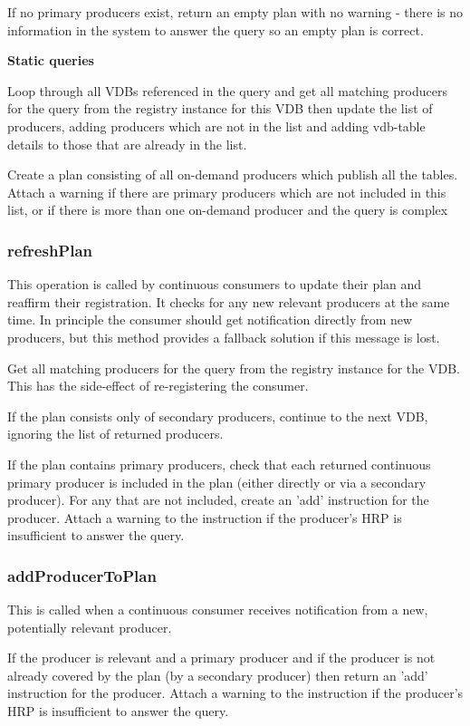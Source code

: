   If no primary producers exist, return an empty plan with no warning - there is no
        information in the system to answer the query so an empty plan is correct.

\textbf{Static queries}

Loop through all VDBs referenced in the query and get all matching producers for
the query from the registry instance for this VDB then update the list of producers, adding producers which are not in the list and
adding vdb-table details to those that are already in the list.
  
Create a plan consisting of all on-demand producers which publish all the tables. 
Attach a warning if there are primary producers which are not included
in this list, or if there is more than one on-demand producer and the query is complex


\subsubsection{refreshPlan}

This operation is called by continuous consumers to update their plan and
reaffirm their registration. It checks for any new relevant producers at the same
time. In principle the consumer should get notification directly from new
producers, but this method provides a fallback solution if this message is lost.

Get all matching producers for the query from the registry instance for the VDB.
This has the side-effect of re-registering the consumer.

If the plan consists only of secondary producers, continue to the next VDB,
ignoring the list of returned producers.

If the plan contains primary producers, check that each returned continuous
primary producer is included in the plan (either directly or via a secondary
producer). For any that are not included, create an 'add' instruction for the
producer. Attach a warning to the instruction if the producer's HRP is
insufficient to answer the query.

\subsubsection{addProducerToPlan}

This is called when a continuous consumer receives notification from a new,
potentially relevant producer.

If the producer is relevant and a  primary producer and if the producer is not
already covered by the plan (by a secondary producer) then  return an 'add'
instruction for the producer. Attach a warning to the instruction if the
producer's HRP is insufficient to answer the query.
 

